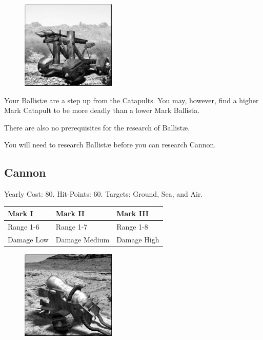 \begin{figure}
	\vspace{-20pt}
	\begin{center}
		\includegraphics[width=0.4\textwidth]{Aballista}
	\end{center}
	\vspace{-20pt}
\end{figure}

Your Ballistæ are a step up from the Catapults. You may, however, find a higher Mark Catapult to be more deadly than a lower Mark Ballista.

There are also no prerequisites for the research of Ballistæ.

You will need to research Ballistæ before you can research Cannon.

\clearpage

\subsection{Cannon}


\begin{center}
	Yearly Cost: 80. Hit-Points: 60. Targets: Ground, Sea, and Air.
\end{center}

\begin{tabular}{ | p{4cm} | p{4cm} | p{4cm} |}
	\hline
	\textbf{Mark I}	& \textbf{Mark II} & \textbf{Mark III} \\ \hline
	Range 1-6	& Range 1-7 & Range 1-8 \\ \hline
	Damage Low	& Damage Medium & Damage High \\ \hline
	\hline
\end{tabular}
   
\begin{figure}
	\vspace{-20pt}
	\begin{center}
		\includegraphics[width=0.4\textwidth]{Acannon}
	\end{center}
	\vspace{-20pt}
\end{figure}

